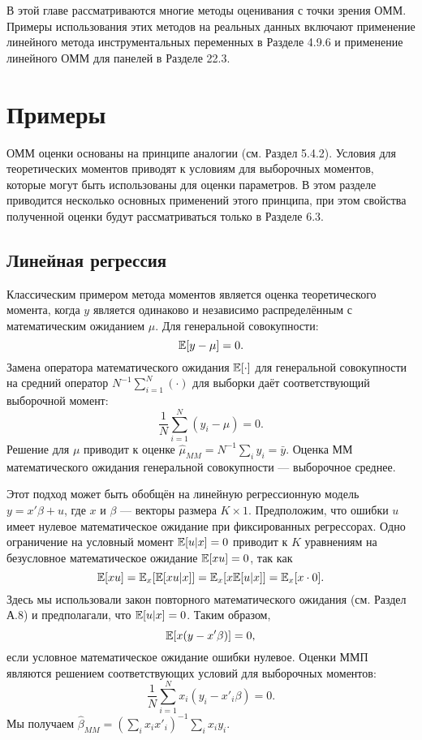 В этой главе рассматриваются многие методы оценивания с точки зрения ОММ. Примеры использования этих методов на реальных данных включают применение линейного метода инструментальных переменных в Разделе 4.9.6 и применение линейного ОММ для панелей в Разделе 22.3.

\section{Примеры}

ОММ оценки основаны на принципе аналогии (см. Раздел 5.4.2). Условия для теоретических моментов приводят к условиям для выборочных моментов, которые могут быть использованы для оценки параметров. В этом разделе приводится несколько основных применений этого принципа, при этом свойства полученной оценки будут рассматриваться только в Разделе 6.3.

\subsection{Линейная регрессия}

Классическим примером метода моментов является оценка теоретического момента, когда
$y$ является одинаково и независимо распределённым с математическим ожиданием $\mu$. Для генеральной совокупности:
\[
\mathbb{E}[y-\mu]=0.
\]
Замена оператора математического ожидания $\mathbb{E}[\cdot]$ для генеральной совокупности на средний оператор $N^{-1} \sum_{i=1}^{N} (\cdot)$ для выборки даёт соответствующий выборочной момент:
\[
\frac{1}{N} \sum_{i=1}^{N} (y_i-\mu)=0.
\]
Решение для $\mu$ приводит к оценке $\hat{\mu}_{MM}=N^{-1} \sum_i y_i=\bar{y}$. Оценка ММ
математического ожидания генеральной совокупности --- выборочное среднее.

Этот подход может быть обобщён на линейную регрессионную модель $y=x'\beta+u$, где
$x$ и $\beta$ --- векторы размера $K \times 1$. Предположим, что ошибки $u$ имеет нулевое математическое ожидание при фиксированных регрессорах. Одно ограничение на условный момент $\mathbb{E}[u|x]=0$ приводит к $K$ уравнениям на безусловное математическое ожидание $\mathbb{E}[xu]=0$, так как
\begin{equation}
\mathbb{E}[xu]=\mathbb{E}_{x}[\mathbb{E}[xu|x]]=\mathbb{E}_{x}[x\mathbb{E}[u|x]]=\mathbb{E}_{x}[x \cdot 0].
\end{equation}
Здесь мы использовали закон повторного  математического ожидания (см. Раздел А.8) и предполагали, что $\mathbb{E}[u|x]=0$. Таким образом,
\[
\mathbb{E}[x(y-x'\beta)]=0,
\]
если условное математическое ожидание ошибки нулевое. Оценки ММП являются решением  соответствующих условий для выборочных моментов:
\[
\frac{1}{N} \sum_{i=1}^{N} x_i(y_i-x'_i\beta)=0.
\]
Мы получаем $\hat{\beta}_{MM}=(\sum_i x_i x'_i)^{-1} \sum_i x_i y_i$.

